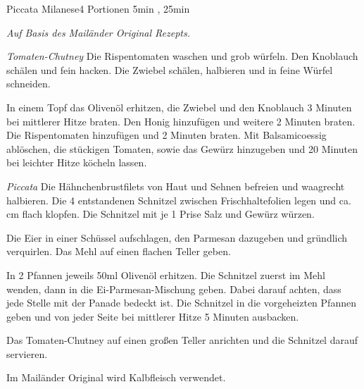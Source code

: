 \documentclass[../recipe-collections/cooking.tex]{subfiles}
\begin{document}
\begin{recipe}{Piccata Milanese}{4 Portionen }{5min , 25min }

  \freeform{}\textit{Auf Basis des Mailänder Original Rezepts.}


  \textit{Tomaten-Chutney}
  Die Rispentomaten waschen und grob würfeln.
  Den Knoblauch schälen und fein hacken.
  Die Zwiebel schälen, halbieren und in feine Würfel schneiden.


  In einem Topf das Olivenöl erhitzen, die Zwiebel und den Knoblauch 3 Minuten bei mittlerer Hitze braten.
  Den Honig hinzufügen und weitere 2 Minuten braten.
  Die Rispentomaten hinzufügen und 2 Minuten braten.
  Mit Balsamicoessig ablöschen, die stückigen Tomaten, sowie das Gewürz hinzugeben und 20 Minuten bei leichter Hitze köcheln lassen.


  \textit{Piccata}
  Die Hähnchenbrustfilets von Haut und Sehnen befreien und waagrecht halbieren.
  Die 4 entstandenen Schnitzel zwischen Frischhaltefolien legen und ca.  cm flach klopfen.
  Die Schnitzel mit je 1 Prise Salz und Gewürz würzen.


  Die Eier in einer Schüssel aufschlagen, den Parmesan dazugeben und gründlich verquirlen.
  Das Mehl auf einen flachen Teller geben.


  In 2 Pfannen jeweils 50ml Olivenöl erhitzen.
  Die Schnitzel zuerst im Mehl wenden, dann in die Ei-Parmesan-Mischung geben.
  Dabei darauf achten, dass jede Stelle mit der Panade bedeckt ist.
  Die Schnitzel in die vorgeheizten Pfannen geben und von jeder Seite bei mittlerer Hitze 5 Minuten ausbacken.

  \newstep{}Das Tomaten-Chutney auf einen großen Teller anrichten und die Schnitzel darauf servieren.

  \freeform{}\hrulefill{}

  \freeform{}
  Im Mailänder Original wird Kalbfleisch verwendet.

\end{recipe}
\end{document}

